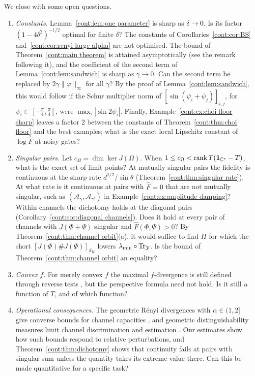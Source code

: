 We close with some open questions.
\begin{enumerate}
\item \emph{Constants.} Lemma~\ref{cont:lem:one parameter} is sharp as $\delta\to0$. Is its factor $(1-4\delta^2)^{-1/2}$ optimal for finite $\delta$? The constants of Corollaries~\ref{cont:cor:BS} and~\ref{cont:cor:renyi large alpha} are not optimised. The bound of Theorem~\ref{cont:main theorem} is attained asymptotically (see the remark following it), and the coefficient of the second term of Lemma~\ref{cont:lem:sandwich} is sharp as $\gamma\to0$. Can the second term be replaced by $2\gamma\|\varphi\|_\infty$ for all $\gamma$? By the proof of Lemma~\ref{cont:lem:sandwich}, this would follow if the Schur multiplier norm of $[\sin(\psi_i+\psi_j)]_{i,j}$, for $\psi_i\in[-\frac\pi4,\frac\pi4]$, were $\max_i|\sin2\psi_i|$. Finally, Example~\ref{cont:ex:choi floor sharp} leaves a factor $2$ between the constants of Theorem~\ref{cont:thm:choi floor} and the best examples; what is the exact local Lipschitz constant of $\log\widehat{F}$ at noisy gates?
\item \emph{Singular pairs.} Let $c_\Omega=\dim\ker J(\Omega)$. When $1\leq c_\Omega<\operatorname{rank} T(\mathbf{1}_{\mathbb{C}^r}-T)$, what is the exact set of limit points? At mutually singular pairs the fidelity is continuous at the sharp rate $d^{1/2}/\sin\theta$ (Theorem~\ref{cont:thm:singular rate}). At what rate is it continuous at pairs with $\widehat{F}=0$ that are not mutually singular, such as $(\mathcal{A}_\gamma,\mathcal{A}_{\gamma'})$ in Example~\ref{cont:ex:amplitude damping}? Within channels the dichotomy holds at the diagonal pairs (Corollary~\ref{cont:cor:diagonal channels}). Does it hold at every pair of channels with $J(\Phi+\Psi)$ singular and $\widehat{F}(\Phi,\Psi)>0$? By Theorem~\ref{cont:thm:channel orbit}(a), it would suffice to find $H$ for which the short $[J(\Phi)\#J(\Psi)]_{\mathcal{S}_H}$ lowers $\lambda_{\min}\circ\operatorname{Tr}_{\mathcal{Y}}$. Is the bound of Theorem~\ref{cont:thm:channel orbit} an equality?
\item \emph{Convex $f$.} For merely convex $f$ the maximal $f$-divergence is still defined through reverse tests \cite{Matsumoto2018newf}, but the perspective formula need not hold. Is it still a function of $T$, and of which function?
\item \emph{Operational consequences.} The geometric R\'enyi divergences with $\alpha\in(1,2]$ give converse bounds for channel capacities \cite{FangFawzi2021}, and geometric distinguishability measures limit channel discrimination and estimation \cite{KatariyaWilde2021}. Our estimates show how such bounds respond to relative perturbations, and Theorem~\ref{cont:thm:dichotomy} shows that continuity fails at pairs with singular sum unless the quantity takes its extreme value there. Can this be made quantitative for a specific task?

\end{enumerate}
